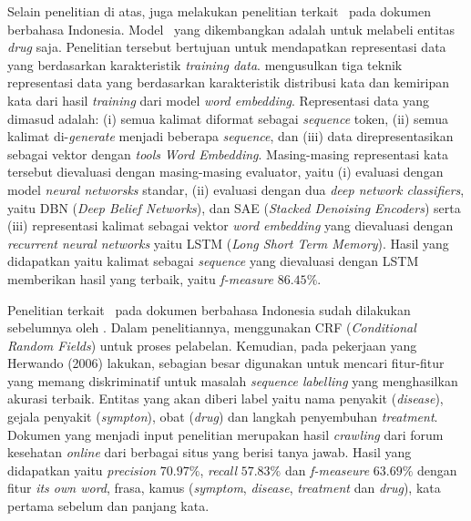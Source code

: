 Selain penelitian di atas, \cite{mujiono2016new} juga melakukan penelitian terkait \mer~pada dokumen berbahasa Indonesia. Model \mer~yang dikembangkan adalah untuk melabeli entitas \textit{drug} saja. Penelitian tersebut bertujuan untuk mendapatkan representasi data yang berdasarkan karakteristik \textit{training data}. \cite{mujiono2016new} mengusulkan tiga teknik representasi data yang berdasarkan karakteristik distribusi kata dan kemiripan kata dari hasil \textit{training} dari model \textit{word embedding}. Representasi data yang dimasud adalah: (i) semua kalimat diformat sebagai \textit{sequence} token, (ii) semua kalimat di-\textit{generate} menjadi beberapa \textit{sequence}, dan (iii) data direpresentasikan sebagai vektor dengan \textit{tools} \textit{Word Embedding}. Masing-masing representasi kata tersebut dievaluasi dengan masing-masing evaluator, yaitu (i) evaluasi dengan model \textit{neural networsks} standar, (ii) evaluasi dengan dua \textit{deep network classifiers}, yaitu DBN (\textit{Deep Belief Networks}), dan SAE (\textit{Stacked Denoising Encoders}) serta (iii) representasi kalimat sebagai vektor \textit{word embedding} yang dievaluasi dengan \textit{recurrent neural networks} yaitu LSTM (\textit{Long Short Term Memory}). Hasil yang didapatkan yaitu kalimat sebagai \textit{sequence} yang dievaluasi dengan LSTM memberikan hasil yang terbaik, yaitu \textit{f-measure} $ 86.45\% $.

Penelitian terkait \mer~pada dokumen berbahasa Indonesia sudah dilakukan sebelumnya oleh \cite{skripsiKakRadit}. Dalam penelitiannya, \cite{skripsiKakRadit} menggunakan CRF (\textit{Conditional Random Fields}) untuk proses pelabelan. Kemudian, pada pekerjaan yang Herwando (2006) lakukan, sebagian besar digunakan untuk mencari fitur-fitur yang memang diskriminatif untuk masalah \textit{sequence labelling} yang menghasilkan akurasi terbaik. Entitas yang akan diberi label yaitu nama penyakit (\textit{disease}), gejala penyakit (\textit{sympton}), obat (\textit{drug}) dan langkah penyembuhan \textit{treatment}. Dokumen yang menjadi input penelitian merupakan hasil \textit{crawling} dari  forum kesehatan \textit{online} dari berbagai situs yang berisi tanya jawab. Hasil yang didapatkan yaitu \textit{precision} $ 70.97\% $, \textit{recall} $ 57.83\% $ dan \textit{f-measeure} $ 63.69\% $ dengan fitur \textit{its own word}, frasa, kamus (\textit{symptom}, \textit{disease}, \textit{treatment} dan \textit{drug}), kata pertama sebelum dan panjang kata.

